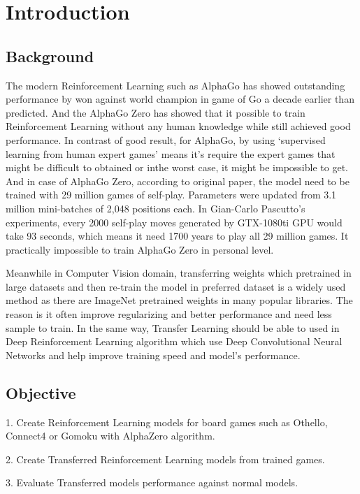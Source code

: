 \documentclass[12pt,a4paper]{article}
\begin{document}
\section{Introduction}
\subsection{Background}
{
\hspace{0.6cm} The modern Reinforcement Learning such as AlphaGo has showed outstanding performance by won against world champion in game of Go a decade earlier than predicted\cite{GovsCom}\cite{AGWeb}. And the AlphaGo Zero has showed that it possible to train Reinforcement Learning without any human knowledge while still achieved good performance\cite{AlphaGoZero}\cite{AlphaZero}. In contrast of good result, for AlphaGo, by using ‘supervised learning from human expert games’\cite{AlphaGo} means it's require the expert games that might be difficult to obtained or inthe worst case, it might be impossible to get. And in case of AlphaGo Zero, according to original paper\cite{AlphaGoZero}, the model need to be trained with 29 million games of self-play. Parameters were updated from 3.1 million mini-batches of 2,048 positions each. In Gian-Carlo Pascutto's experiments, every 2000 self-play moves generated by GTX-1080ti GPU would take 93 seconds, which means it need 1700 years to play all 29 million games\cite{GCP}. It practically impossible to train AlphaGo Zero in personal level.\par
\hspace{0cm} Meanwhile in Computer Vision domain, transferring weights which pretrained in large datasets and then re-train the model in preferred dataset is a widely used method as there are ImageNet\cite{Imagenet} pretrained weights in many popular libraries\cite{TFpaper}\cite{Pytorch}\cite{Keras}. The reason is it often improve regularizing and better performance and need less sample to train\cite{Transferable}. In the same way, Transfer Learning should be able to used in Deep Reinforcement Learning algorithm which use Deep Convolutional Neural Networks and help improve training speed and model's performance.\par
}
\subsection{Objective}
{
\hspace{0.6cm} 1. Create Reinforcement Learning models for board games such as Othello, Connect4 or Gomoku with AlphaZero algorithm.\par
\hspace{0cm} 2. Create Transferred Reinforcement Learning models from trained games.\par
\hspace{0cm} 3. Evaluate Transferred models performance against normal models.\par
}
\end{document}
